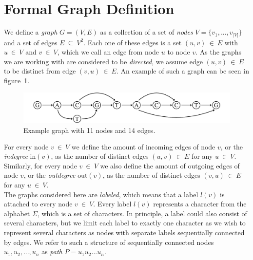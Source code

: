 \documentclass[a4paper,12pt,twoside,BCOR=10mm]{scrbook}
\begin{document}
\section{Formal Graph Definition}
\label{sec:graph_definition}
%
We define a \textit{graph} $ G = (V, E) $ as a collection of a set 
of \textit{nodes} $ V = \{ v_1, ..., v_{|V|} \} $ and a set of edges $ E {\: \subseteq \:} V^2 $. 
Each one of these edges is a set $ (u, v) {\: \in \:} E $ with $ u {\: \in \:} V $ and $ v {\: \in \:} V $, 
which we call an edge from node $ u $ to node $ v $. 
As the graphs we are working with are considered to be \textit{directed}, 
we assume edge $ (u, v) {\: \in \:} E $ to 
be distinct from edge $ (v, u) {\: \in \:} E $. 
An example of such a graph can be seen in figure~\ref{fig:evo_fig_graph_example}. \\
\begin{figure}[!htb]
\centering
\includegraphics[width=\textwidth]{evo_fig_graph_example.pdf}
\caption[Example graph]{Example graph with 11 nodes and 14 edges.} \label{fig:evo_fig_graph_example}
\end{figure}
For every node $ v {\: \in \:} V $ we define the amount of incoming edges of 
node $ v $, or the \textit{indegree} $ \textrm{in} ( v ) $, as the number of 
distinct edges $ (u, v) {\: \in \:} E $ for any $ u {\: \in \:} V $. 
Similarly, for every node $ v {\: \in \:} V $ we also define the amount of outgoing edges of 
node $ v $, or the \textit{outdegree} $ \textrm{out} ( v ) $, as the number of 
distinct edges $ (v, u) {\: \in \:} E $ for any $ u {\: \in \:} V $. \\
The graphs considered here are \textit{labeled}, which means that a label $ l( v ) $ is attached 
to every node $ v {\: \in \:} V $. 
Every label $ l( v ) $ represents a character 
from the alphabet $ \Sigma $, which is a set of characters. 
In principle, a label could also consist of several characters, 
but we limit each label to exactly one character as we wish to 
represent several characters as nodes with separate labels sequentially connected by edges. 
We refer to such a structure of sequentially connected 
nodes $ u_1, u_2, ..., u_n $ as \textit{path} $ P = u_1 u_2 ... u_n $.
\end{document}
